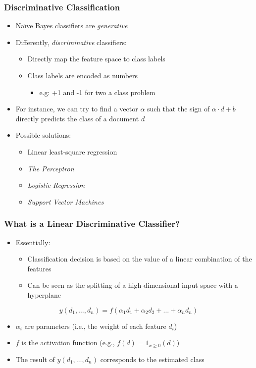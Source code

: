 \documentclass{beamer}
\begin{document}
\begin{frame} \frametitle{Discriminative Classification}

  \begin{itemize}
  \item Na{\"i}ve Bayes classifiers are \emph{generative}
  \item Differently, \emph{discriminative} classifiers:
    \begin{itemize}
    \item Directly map the feature space to class labels
    \item Class labels are encoded as numbers
      \begin{itemize}
      \item e.g: +1 and -1 for two a class problem
      \end{itemize}
    \end{itemize}
  \item For instance, we can try to find a vector $\alpha$ such that the sign
    of $\alpha \cdot d + b$ directly predicts the class of a document $d$
  \item Possible solutions:
    \begin{itemize}
    \item Linear least-square regression
    \item \emph{The Perceptron}
    \item \emph{Logistic Regression}
    \item \emph{Support Vector Machines}
    \end{itemize}
  \end{itemize}
  
\end{frame}


\begin{frame} \frametitle{What is a Linear Discriminative Classifier?}
  \begin{itemize}
  \item Essentially:
    \begin{itemize}
    \item Classification decision is based on the value of a linear combination of the features
    \item Can be seen as the splitting of a high-dimensional input space with a hyperplane
    \end{itemize}
  \end{itemize}
  \begin{equation*}
    y(d_1,\ldots,d_n) = f(\alpha_1d_1 + \alpha_2d_2 + \ldots + \alpha_nd_n)
  \end{equation*}
  \begin{itemize}
    \item $\alpha_i$ are parameters (i.e., the weight of each feature $d_i$)
    \item $f$ is the activation function (e.g., $f(d) = 1_{x \geq 0}(d)$)
    \item The result of $y(d_1,\ldots,d_n)$ corresponds to the estimated class
  \end{itemize}
\end{frame}
\end{document}
